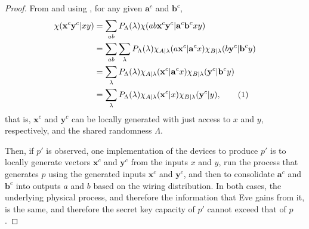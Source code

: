 \documentclass[10pt, a4paper]{article}
\numberwithin{equation}{section} %
\theoremstyle{definition}
\theoremstyle{plain}
\newcommand{\usenumber}{%
  \refstepcounter{equation}\tag{\theequation}
}
\newcommand{\?}{\mathrel{?}} %
\newcommand{\cvec}[1]{\boldsymbol{\mathbf{#1}}}    %
\begin{document}
                  \begin{proof}
                    From  and using , for any given \(\cvec{a}^c\) and \(\cvec{b}^c\),
                    \begin{align*}
                      \chi(\cvec{x}^c\cvec{y}^c|xy) &= \sum_{ab} P_{\Lambda}(\lambda) \chi(ab\cvec{x}^c\cvec{y}^c|\cvec{a}^c\cvec{b}^cxy) \\
                                                    &= \sum_{ab} \sum_{\lambda} P_{\Lambda}(\lambda) \chi_{A|\lambda}(a\cvec{x}^c|\cvec{a}^cx) \chi_{B|\lambda}(b\cvec{y}^c|\cvec{b}^cy) \\
                                                    &= \sum_{\lambda} P_{\Lambda}(\lambda) \chi_{A|\lambda}(\cvec{x}^c|\cvec{a}^cx) \chi_{B|\lambda}(\cvec{y}^c|\cvec{b}^cy)  \\
                                                    &= \sum_{\lambda} P_{\Lambda}(\lambda) \chi_{A|\lambda}(\cvec{x}^c|x) \chi_{B|\lambda}(\cvec{y}^c|y), \usenumber \label{eqn:nooutputmwir}
                    \end{align*}
                    that is, \(\cvec{x}^c\) and \(\cvec{y}^c\) can be locally generated with just access to \(x\) and \(y\), respectively, and the shared randomness \(\Lambda\).

                    Then, if \(p'\) is observed, one implementation of the devices to produce \(p'\) is to locally generate vectors \(\cvec{x}^c\) and \(\cvec{y}^c\) from the inputs \(x\) and \(y\), run the process that generates \(p\) using the generated inputs \(\cvec{x}^c\) and \(\cvec{y}^c\), and then to consolidate \(\cvec{a}^c\) and \(\cvec{b}^c\) into outputs \(a\) and \(b\) based on the wiring distribution. In both cases, the underlying physical process, and therefore the information that Eve gains from it, is the same, and therefore the secret key capacity of \(p'\) cannot exceed that of \(p\).


\end{proof}
\end{document}

